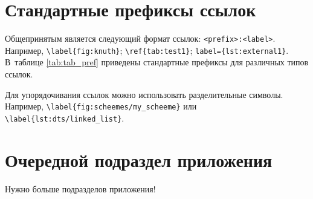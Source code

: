 \section{Стандартные префиксы ссылок}\label{app:B4}

Общепринятым является следующий формат ссылок: \texttt{<prefix>:<label>}.
Например, \verb+\label{fig:knuth}+; \verb+\ref{tab:test1}+; \verb+label={lst:external1}+.
В~таблице \cref{tab:tab_pref} приведены стандартные префиксы для различных
типов ссылок.

\begin{table}[htbp]
    \captionsetup{justification=centering}
\end{table}


Для упорядочивания ссылок можно использовать разделительные символы.
Например, \verb+\label{fig:scheemes/my_scheeme}+ или \\ \verb+\label{lst:dts/linked_list}+.

\section{Очередной подраздел приложения}\label{app:B5}

Нужно больше подразделов приложения!

